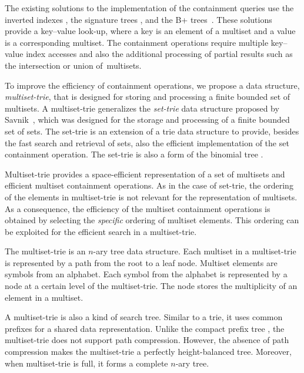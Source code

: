 \documentclass[algorithms,article,accept,pdftex,moreauthors]{Definitions/mdpi}
\begin{document}
The existing solutions to the implementation of the containment queries use the inverted indexes \cite{zobel1992efficient,zobel1998inverted,zobel2006csur,broder2006indexing,terrovitis2006cikm,terrovitis2011icdt}, the signature trees \cite{deppisch1986sigir,tousidou2002sigstruc,yangjun2005stree,zobel1998inverted}, and the B+ trees~\cite{Helmer2003,terrovitis2011icdt}. These solutions provide a key--value look-up, where a key is an element of a multiset and a value is a corresponding multiset. The containment operations require multiple key--value index accesses and also the additional processing of partial results such as the intersection or union of~multisets.

To improve the efficiency of containment operations, we propose a data structure, \emph{multiset-trie}, that is designed for storing and processing a finite bounded set of multisets. A multiset-trie generalizes the \emph{set-trie} data structure proposed by Savnik~\cite{savnik2013index,savnik2021plos}, which was designed for the storage and processing of a finite bounded set of sets. 
The set-trie is an extension of a trie data structure to provide, besides the fast search and retrieval of sets, also the efficient implementation of the set containment operation. The set-trie is also a form of the binomial tree \cite{corman2001}.

Multiset-trie provides a space-efficient representation of a set of multisets and efficient multiset containment operations. As in the case of set-trie, the ordering of the elements in multiset-trie is not relevant for the representation of multisets. As a consequence, the efficiency of the multiset containment operations is obtained by selecting the \emph{specific} ordering of multiset elements. This ordering can be exploited for the efficient search in a multiset-trie.  

The multiset-trie is an $n$-ary tree data structure. Each multiset in a multiset-trie is represented by a path from the root to a leaf node. Multiset elements are symbols from an alphabet. Each symbol from the alphabet is represented by a node at a certain level of the multiset-trie. The node stores the multiplicity of an element in a multiset.

A multiset-trie is also a kind of search tree. Similar to a trie, it uses common prefixes for a shared data representation. Unlike the compact prefix tree \cite{Sedgewick:2011:ALG:2011916}, the multiset-trie does not support path compression. However, the absence of path compression makes the multiset-trie a perfectly height-balanced tree. Moreover, when multiset-trie is full, it forms a complete $n$-ary tree.
\end{document}
